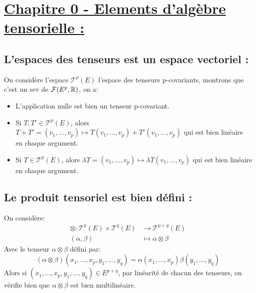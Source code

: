 \section*{\uline{Chapitre 0 - Elements d'algèbre tensorielle {:}}}
   \subsection*{L'espaces des tenseurs est un espace vectoriel {:}}
      On considère l'espace \( \mathscr{T}^p(E) \) l'espace des tenseurs p-covariants, montrons que c'est un sev de \( \mathcal{F}(E^p, \mathbb{R}) \), on a:
      \begin{itemize}
         \item L'application nulle est bien un tenseur p-covariant.
         \item Si \( T, T' \in \mathscr{T}^p(E)\), alors \( T + T' = (v_1, \ldots, v_p) \mapsto T(v_1, \ldots, v_p) + T'(v_1, \ldots, v_p) \) qui est bien linéaire en chaque argument.
         \item Si \( T \in \mathscr{T}^p(E)\), alors \( \lambda T = (v_1, \ldots, v_p) \mapsto \lambda T(v_1, \ldots, v_p) \) qui est bien linéaire en chaque argument.
      \end{itemize}
   \subsection*{Le produit tensoriel est bien défini {:}}
On considère: 
\begin{align*}
   \otimes : \mathscr{T}^p(E) \times \mathscr{T}^q(E) &\longrightarrow \mathscr{T}^{p+q}(E)\\
   (\alpha, \beta) &\longmapsto \alpha \otimes \beta
\end{align*}
Avec le tenseur \(\alpha \otimes \beta\) défini par:
\[
   (\alpha \otimes \beta)(x_1, \ldots, x_p, y_1, \ldots, y_q) = \alpha(x_1, \ldots, x_p)\beta(y_1, \ldots, y_q)
\]
Alors si \( (x_1, \ldots, x_p, y_1, \ldots, y_q) \in E^{p+q} \), par linéarité de chacun des tenseurs, on vérifie bien que \( \alpha \otimes \beta \) est bien multilinéaire.
